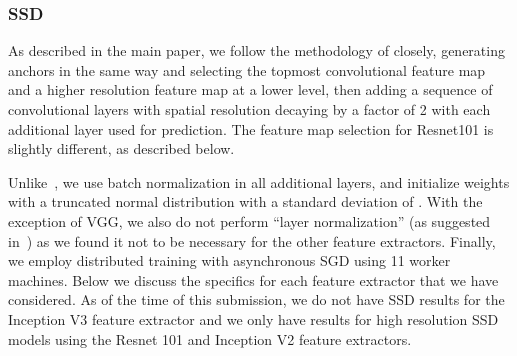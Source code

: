 \documentclass[10pt,twocolumn,letterpaper]{article}
\begin{document}
\subsubsection{SSD}
As described in the main paper, we follow
the methodology of \cite{liu2015ssd} closely, 
generating anchors in the same way and
selecting the topmost convolutional feature map and a 
higher resolution feature map at a lower level, then adding a sequence of 
convolutional layers with spatial resolution decaying by a factor of 2
with each additional layer used for prediction. The feature map selection for Resnet101 is slightly different, as described below.

Unlike~\cite{liu2015ssd}, we use batch normalization in all additional layers, and 
initialize weights with a truncated normal distribution with a standard deviation of .
With the exception of VGG, we also do not perform ``layer normalization'' (as suggested in~\cite{liu2015ssd}) as we found it not to be necessary for the other feature extractors.
Finally, we employ distributed training with asynchronous SGD using 11 worker machines.
Below we discuss the specifics for each feature extractor that we have considered.
As of the time of this submission, we do not have SSD results for the Inception V3
feature extractor and we only have results for high resolution SSD models 
using the Resnet 101 and Inception V2 feature extractors.
\end{document}
